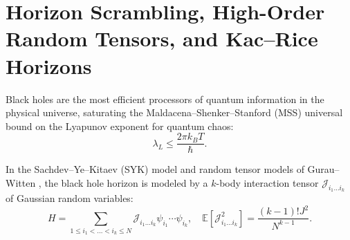 \documentclass[11pt,a4paper,reqno]{amsart}
\theoremstyle{definition}
\numberwithin{equation}{section}
\begin{document}
\section{Horizon Scrambling, High-Order Random Tensors, and Kac--Rice Horizons}
\label{sec:horizon_scrambling}

Black holes are the most efficient processors of quantum information in the physical universe, saturating the Maldacena--Shenker--Stanford (MSS) universal bound on the Lyapunov exponent for quantum chaos:
\begin{equation}
    \label{eq:mss_bound}
    \lambda_L \le \frac{2\pi k_B T}{\hbar}.
\end{equation}

In the Sachdev--Ye--Kitaev (SYK) model and random tensor models of Gurau--Witten \cite{verstraete2010continuous}, the black hole horizon is modeled by a $k$-body interaction tensor $\mathcal{J}_{i_1 \dots i_k}$ of Gaussian random variables:
\begin{equation}
    H = \sum_{1 \le i_1 < \dots < i_k \le N} \mathcal{J}_{i_1 \dots i_k} \psi_{i_1} \cdots \psi_{i_k}, \quad \mathbb{E}[\mathcal{J}_{i_1 \dots i_k}^2] = \frac{(k-1)! J^2}{N^{k-1}}.
\end{equation}
\end{document}

